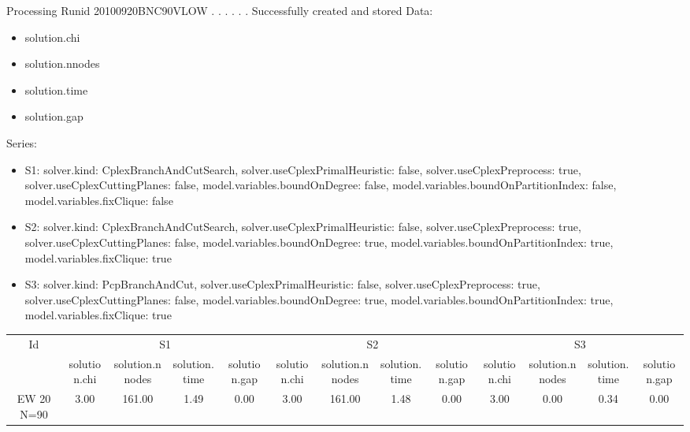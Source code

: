 \documentclass[landscape, 12pt]{report}
\begin{document}
	Processing Runid 20100920BNC90VLOW
. . . . . .  Successfully created and stored
Data:
\begin{itemize}
\item solution.chi
\item solution.nnodes
\item solution.time
\item solution.gap
\end{itemize}
Series:
\begin{itemize}
\item S1: solver.kind: CplexBranchAndCutSearch, solver.useCplexPrimalHeuristic: false, solver.useCplexPreprocess: true, solver.useCplexCuttingPlanes: false, model.variables.boundOnDegree: false, model.variables.boundOnPartitionIndex: false, model.variables.fixClique: false
\item S2: solver.kind: CplexBranchAndCutSearch, solver.useCplexPrimalHeuristic: false, solver.useCplexPreprocess: true, solver.useCplexCuttingPlanes: false, model.variables.boundOnDegree: true, model.variables.boundOnPartitionIndex: true, model.variables.fixClique: true
\item S3: solver.kind: PcpBranchAndCut, solver.useCplexPrimalHeuristic: false, solver.useCplexPreprocess: true, solver.useCplexCuttingPlanes: false, model.variables.boundOnDegree: true, model.variables.boundOnPartitionIndex: true, model.variables.fixClique: true
\end{itemize}
\begin{tabular}{|c|cccc|cccc|cccc|}
\hline
\multicolumn{1}{|c|}{Id} & \multicolumn{4}{|c|}{S1} & \multicolumn{4}{|c|}{S2} & \multicolumn{4}{|c|}{S3}
\\
 & solution.chi & solution.nnodes & solution.time & solution.gap & solution.chi & solution.nnodes & solution.time & solution.gap & solution.chi & solution.nnodes & solution.time & solution.gap
\\
\hline
EW 20 N=90 & 3.00 & 161.00 & 1.49 & 0.00 & 3.00 & 161.00 & 1.48 & 0.00 & 3.00 & 0.00 & 0.34 & 0.00
\\
\hline 
 \end{tabular}
 
\end{document}
